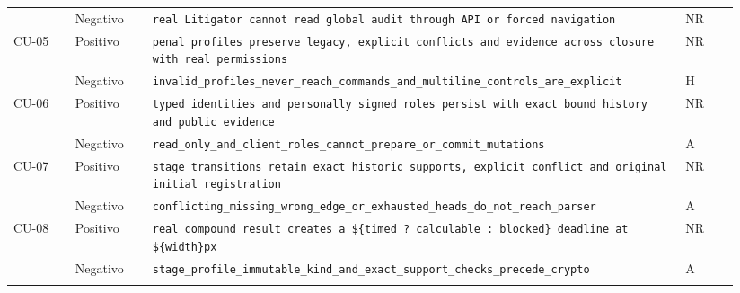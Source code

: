 \begin{longtable}{@{}L{0.08\linewidth} L{0.10\linewidth} L{0.69\linewidth} C{0.07\linewidth}@{}}
   & Negativo & \newline \texttt{real Litigator cannot read global audit through API or forced navigation} & NR \\
  \addlinespace
  CU-05 & Positivo & \newline \texttt{penal profiles preserve legacy, explicit conflicts and evidence across closure with real permissions} & NR \\*
   & Negativo & \newline \texttt{invalid\_profiles\_never\_reach\_commands\_and\_multiline\_controls\_are\_explicit} & H \\
  \addlinespace
  CU-06 & Positivo & \newline \texttt{typed identities and personally signed roles persist with exact bound history and public evidence} & NR \\*
   & Negativo & \newline \texttt{read\_only\_and\_client\_roles\_cannot\_prepare\_or\_commit\_mutations} & A \\
  \addlinespace
  CU-07 & Positivo & \newline \texttt{stage transitions retain exact historic supports, explicit conflict and original initial registration} & NR \\*
   & Negativo & \newline \texttt{conflicting\_missing\_wrong\_edge\_or\_exhausted\_heads\_do\_not\_reach\_parser} & A \\
  \addlinespace
  CU-08 & Positivo & \newline \texttt{real compound result creates a \$\{timed ? \textquotesingle{}calculable\textquotesingle{} : \textquotesingle{}blocked\textquotesingle{}\} deadline at \$\{width\}px} & NR \\*
   & Negativo & \newline \texttt{stage\_profile\_immutable\_kind\_and\_exact\_support\_checks\_precede\_crypto} & A \\
  \addlinespace

\end{longtable}
